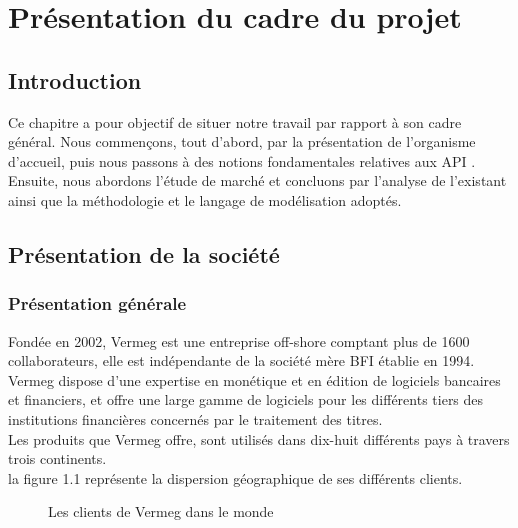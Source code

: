 \chapter{Présentation du cadre du projet}
\section*{Introduction}
Ce chapitre a pour objectif de situer notre travail par rapport à son cadre général.
Nous commençons, tout d’abord, par la présentation de l'organisme d'accueil,
puis nous passons à des notions fondamentales relatives aux API .
Ensuite, nous abordons l'étude de marché et concluons par l'analyse de l'existant ainsi que la méthodologie et le langage de modélisation adoptés.


\section{Présentation de la société}
\subsection{Présentation générale }
Fondée en 2002, Vermeg est une entreprise off-shore comptant plus de 1600 collaborateurs, elle
est indépendante de la société mère BFI établie en 1994.
Vermeg dispose d'une expertise en monétique et en édition de logiciels bancaires et financiers, et offre une large gamme de logiciels pour les différents tiers des institutions financières concernés par le traitement des titres. \\
Les produits que Vermeg offre, sont utilisés dans dix-huit différents pays à travers trois continents. \\
la figure 1.1 représente la dispersion géographique de ses différents clients. \cite[]{vermeg}
\begin{figure}[H]    
    \centering
        \caption{Les clients de Vermeg dans le monde }
        \label{fig:logo_tt}
    \end{figure}
\pagebreak
